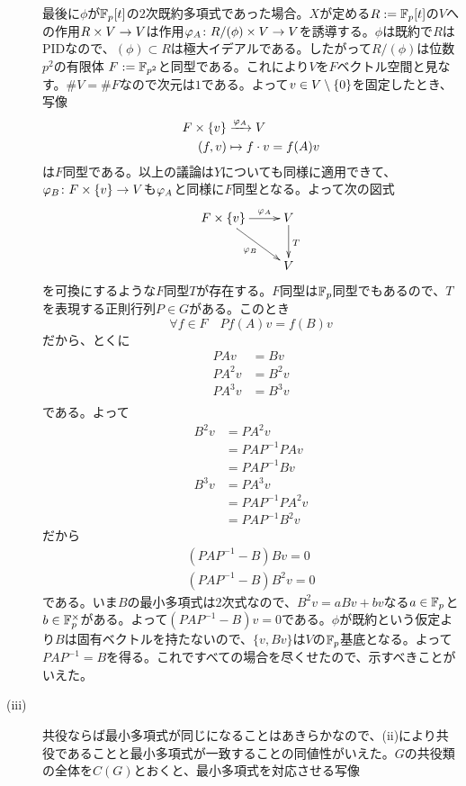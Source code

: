 \begin{sol}
\begin{description}
    最後に$\phi$が${\mathbb F}_p[t]$の$2$次既約多項式であった場合。$X$が定める$R := {\mathbb F}_p[t]$の$V$への作用$R \times V \to V$は作用${\varphi}_A \colon R / (\phi) \times V \to V$を誘導する。$\phi$は既約で$R$はPIDなので、$(\phi) \subset R$は極大イデアルである。したがって$R / (\phi)$は位数$p^2$の有限体
    $F := {\mathbb F}_{p^2}$と同型である。これにより$V$を$F$ベクトル空間と見なす。$\# V = \# F$なので次元は$1$である。よって$v \in V \setminus \{0\}$を固定したとき、写像
    \begin{align*}
      F \times \{ v \} &\xrightarrow{{\varphi}_A} V \\
      (f,v) &\mapsto f \cdot v = f(A)v
      \end{align*}
      は$F$同型である。以上の議論は$Y$についても同様に適用できて、${\varphi}_B \colon F \times \{v\} \to V$も${\varphi}_A$と同様に$F$同型となる。よって次の図式
      \[
      \xymatrix{
      F \tm \{v\} \ar[dr]_-{\vp_B} \ar[r]^-{\vp_A} & V \ar[d]^T \\
{} & V
      }
      \]
      を可換にするような$F$同型$T$が存在する。$F$同型は${\mathbb F}_p$同型でもあるので、$T$を表現する正則行列$P \in G$がある。このとき
      \[
      \forall f \in F \quad Pf(A)v = f(B)v
      \]
      だから、とくに
      \begin{align*}
        PAv &= Bv \\
        PA^2v &= B^2v \\
        PA^3v &= B^3v \\
      \end{align*}
      である。よって
      \begin{align*}
        B^2 v &= PA^2 v \\
        &= PAP^{-1} PAv \\
        &= PAP^{-1} Bv \\
        B^3 v &= PA^3 v \\
        &= PAP^{-1} PA^2v \\
        &= PAP^{-1} B^2v
      \end{align*}
      だから
      \begin{align*}
        (PAP^{-1} - B) Bv = 0 \\
        (PAP^{-1} - B) B^2v = 0
      \end{align*}
      である。いま$B$の最小多項式は$2$次式なので、$B^2v= a Bv + b v$なる$a \in {\mathbb F}_p$と$b \in {\mathbb F}_p^{\times}$がある。よって$(PAP^{-1} - B)v = 0$である。$\phi$が既約という仮定より$B$は固有ベクトルを持たないので、$\{ v, Bv\}$は$V$の${\mathbb F}_p$基底となる。よって$PAP^{-1} = B$を得る。これですべての場合を尽くせたので、示すべきことがいえた。
      \item[(iii)] 共役ならば最小多項式が同じになることはあきらかなので、(ii)により共役であることと最小多項式が一致することの同値性がいえた。$G$の共役類の全体を$C(G)$とおくと、最小多項式を対応させる写像

\end{description}
\end{sol}

